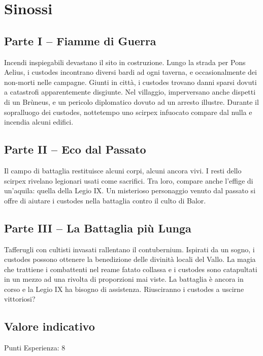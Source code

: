 \documentclass[11.5pt,twocolumn]{article}
\begin{document}
\section*{Sinossi}

\subsection*{Parte I -- Fiamme di Guerra}
%
Incendi inspiegabili devastano il sito in costruzione.
Lungo la strada per Pons Aelius, i custodes incontrano diversi bardi ad ogni taverna, e occasionalmente dei non-morti nelle campagne.
Giunti in citt\`{a}, i custodes trovano danni sparsi dovuti a catastrofi apparentemente disgiunte.
Nel villaggio, imperversano anche dispetti di un Br\`{u}neus, e un pericolo diplomatico dovuto ad un arresto illustre.
Durante il sopralluogo dei custodes, nottetempo uno scirpex infuocato compare dal nulla e incendia alcuni edifici.

\subsection*{Parte II -- Eco dal Passato}
Il campo di battaglia restituisce alcuni corpi, alcuni ancora vivi.
I resti dello scirpex rivelano legionari usati come sacrifici.
Tra loro, compare anche l'effige di un'aquila: quella della Legio IX.
Un misterioso personaggio venuto dal passato si offre di aiutare i custodes nella battaglia contro il culto di Balor.

\subsection*{Parte III -- La Battaglia pi\`{u} Lunga}
Tafferugli con cultisti invasati rallentano il contubernium.
Ispirati da un sogno, i custodes possono ottenere la benedizione delle divinit\`{a} locali del Vallo.
La magia che trattiene i combattenti nel reame fatato collassa e i custodes sono catapultati in un mezzo ad una rivolta di proporzioni mai viste.
La battaglia \`{e} ancora in corso e la Legio IX ha bisogno di assistenza.
Riusciranno i custodes a uscirne vittoriosi?

\subsection*{Valore indicativo}
Punti Esperienza: 8
\end{document}
